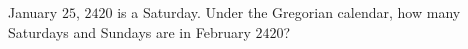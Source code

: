 January $25$, $2420$ is a Saturday. Under the Gregorian calendar, how many Saturdays and Sundays are in February $2420$?
